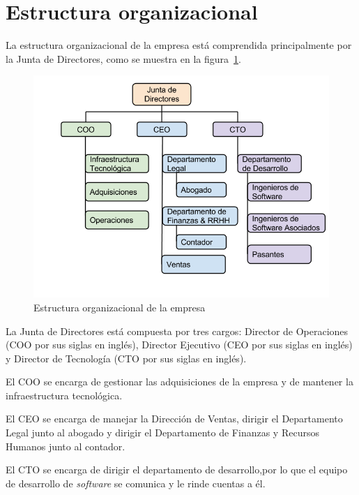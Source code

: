 \section{Estructura organizacional} \label{Estuctura organizacional}

La estructura organizacional de la empresa está comprendida principalmente por la Junta de Directores, como se muestra en la figura~\ref{fig:estructuraEmpresa}.

\begin{figure}[ht]
  \centering
  \includegraphics[scale=0.45,type=png,ext=.png,read=.png]{imagenes/estructura_empresa}
  \caption{Estructura organizacional de la empresa}
  \label{fig:estructuraEmpresa}
\end{figure}

La Junta de Directores está compuesta por tres cargos: Director de Operaciones (COO por sus siglas en inglés), Director Ejecutivo (CEO por sus siglas en inglés) y Director de Tecnología (CTO por sus siglas en inglés).

El COO se encarga de gestionar las adquisiciones de la empresa y de mantener la infraestructura tecnológica.

El CEO se encarga de manejar la Dirección de Ventas, dirigir el Departamento Legal junto al abogado y dirigir el Departamento de Finanzas y Recursos Humanos junto al contador.

El CTO se encarga de dirigir el departamento de desarrollo,por lo que el equipo de desarrollo de \textit{software} se comunica y le rinde cuentas a él.


